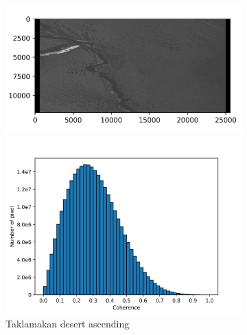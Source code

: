 \documentclass[a4paper,fleqn]{cas-sc}
\begin{document}
\begin{figure}
    \centering
    \begin{subfigure}[c]{0.5\textwidth}
        \centering
        \begin{minipage}[c]{0.5\textwidth}
            \centering
            \includegraphics[width=\textwidth]{figure/The coherence/coh_TaklimakanDesert_asc_esd1.png}
        \end{minipage}%
        \begin{minipage}[c]{0.5\textwidth}
            \centering
            \includegraphics[width=\textwidth]{figure/The coherence/coh_TaklimakanDesert_asc_esd1_histogram_.png}
        \end{minipage}
        \caption{Taklamakan desert ascending}
        \label{fig_6a}
    \end{subfigure}%
    \begin{subfigure}[c]{0.5\textwidth}
        \centering
        \begin{minipage}[c]{0.5\textwidth}

\end{minipage}
\end{subfigure}
\end{figure}
\end{document}
